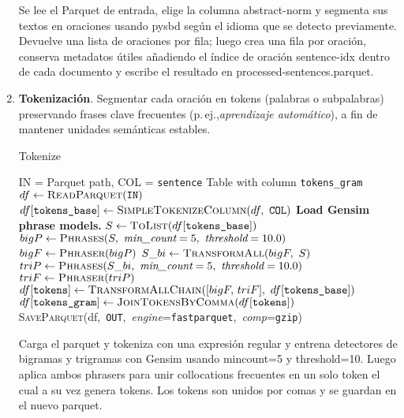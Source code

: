 \begin{enumerate}
Se lee el Parquet de entrada, elige la columna abstract-norm y segmenta sus textos en oraciones usando pysbd según el idioma que se detecto previamente.
Devuelve una lista de oraciones por fila; luego crea una fila por oración, conserva metadatos útiles 
añadiendo el índice de oración sentence-idx dentro de cada documento y escribe el resultado en processed-sentences.parquet.

    \item \textbf{Tokenización}. Segmentar cada oración en tokens (palabras o subpalabras) preservando frases clave frecuentes (p.\,ej.,\textit{aprendizaje automático}), a fin de mantener unidades semánticas estables.

  \begin{algorithmEN}[H]
  \caption{Tokenize} 
  \begin{algorithmic}[1] 
    \Require IN = Parquet path, COL = \texttt{sentence} 
    \Ensure Table with column \texttt{tokens\_gram} 
    \State $df \leftarrow \textsc{ReadParquet}(\texttt{IN})$  
    \State $df[\texttt{tokens\_base}] \leftarrow \textsc{SimpleTokenizeColumn}(df,\ \texttt{COL})$  
    \State \textbf{Load Gensim phrase models.} \State $S \leftarrow \textsc{ToList}(df[\texttt{tokens\_base}])$  \State $bigP \Assign \textsc{Phrases}(S,\ \textit{min\_count}=5,\ \textit{threshold}=10.0)$  \State $bigF \leftarrow \textsc{Phraser}(bigP)$  
    \State $S\_bi \Assign \textsc{TransformAll}(bigF,\ S)$  
    \State $triP \Assign \textsc{Phrases}(S\_bi,\ \textit{min\_count}=5,\ \textit{threshold}=10.0)$  
    \State $triF \leftarrow \textsc{Phraser}(triP)$  
    \State $df[\texttt{tokens}] \Assign \textsc{TransformAllChain}([bigF,\,triF],\ df[\texttt{tokens\_base}])$  
    \State $df[\texttt{tokens\_gram}] \leftarrow \textsc{JoinTokensByComma}(df[\texttt{tokens}])$  
    \State \textsc{SaveParquet}(df,\ \texttt{OUT},\ \textit{engine}=\texttt{fastparquet},\ \textit{comp}=\texttt{gzip})  
  \end{algorithmic}
  \label{alg:tokenize} 
  \end{algorithmEN}

Carga el parquet y tokeniza con una expresión regular y entrena detectores de bigramas y trigramas con Gensim usando mincount=5 y threshold=10. 
Luego aplica ambos phrasers para unir collocations frecuentes en un solo token el cual a su vez genera tokens. Los tokens son unidos por comas y se guardan en el nuevo parquet.


\end{enumerate}
